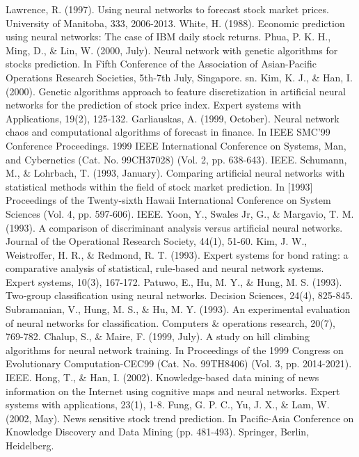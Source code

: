\documentclass[a4paper,12pt]{report}
\begin{document}
%
%
\begin{thebibliography}{9}
	Lawrence, R. (1997). Using neural networks to forecast stock market prices. University of Manitoba, 333, 2006-2013.
	White, H. (1988). Economic prediction using neural networks: The case of IBM daily stock returns.
	Phua, P. K. H., Ming, D., \& Lin, W. (2000, July). Neural network with genetic algorithms for stocks prediction. In Fifth Conference of the Association of Asian-Pacific Operations Research Societies, 5th-7th July, Singapore. sn.
	Kim, K. J., \& Han, I. (2000). Genetic algorithms approach to feature discretization in artificial neural networks for the prediction of stock price index. Expert systems with Applications, 19(2), 125-132.
	Garliauskas, A. (1999, October). Neural network chaos and computational algorithms of forecast in finance. In IEEE SMC'99 Conference Proceedings. 1999 IEEE International Conference on Systems, Man, and Cybernetics (Cat. No. 99CH37028) (Vol. 2, pp. 638-643). IEEE.
	Schumann, M., \& Lohrbach, T. (1993, January). Comparing artificial neural networks with statistical methods within the field of stock market prediction. In [1993] Proceedings of the Twenty-sixth Hawaii International Conference on System Sciences (Vol. 4, pp. 597-606). IEEE.
	Yoon, Y., Swales Jr, G., \& Margavio, T. M. (1993). A comparison of discriminant analysis versus artificial neural networks. Journal of the Operational Research Society, 44(1), 51-60.
	Kim, J. W., Weistroffer, H. R., \& Redmond, R. T. (1993). Expert systems for bond rating: a comparative analysis of statistical, rule‐based and neural network systems. Expert systems, 10(3), 167-172.
	Patuwo, E., Hu, M. Y., \& Hung, M. S. (1993). Two‐group classification using neural networks. Decision Sciences, 24(4), 825-845.
	Subramanian, V., Hung, M. S., \& Hu, M. Y. (1993). An experimental evaluation of neural networks for classification. Computers \& operations research, 20(7), 769-782.
	Chalup, S., \& Maire, F. (1999, July). A study on hill climbing algorithms for neural network training. In Proceedings of the 1999 Congress on Evolutionary Computation-CEC99 (Cat. No. 99TH8406) (Vol. 3, pp. 2014-2021). IEEE.
	Hong, T., \& Han, I. (2002). Knowledge-based data mining of news information on the Internet using cognitive maps and neural networks. Expert systems with applications, 23(1), 1-8.
	Fung, G. P. C., Yu, J. X., \& Lam, W. (2002, May). News sensitive stock trend prediction. In Pacific-Asia Conference on Knowledge Discovery and Data Mining (pp. 481-493). Springer, Berlin, Heidelberg.

\end{thebibliography}
\end{document}
